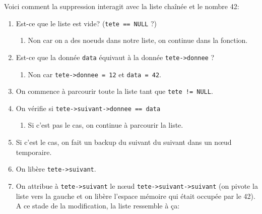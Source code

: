 \documentclass[11pt]{article}
\begin{document}
Voici comment la suppression interagit avec la liste chaînée et le nombre 42:
\begin{enumerate}
\item Est-ce que le liste est vide? (\texttt{tete == NULL} ?)
  \begin{enumerate}
  \item Non car on a des noeuds dans notre liste, on continue dans la fonction.
  \end{enumerate}
\item Est-ce que la donnée \texttt{data} équivaut à la donnée \texttt{tete->donnee} ?
  \begin{enumerate}
  \item Non car \texttt{tete->donnee = 12} et \texttt{data = 42}.
  \end{enumerate}
\item On commence à parcourir toute la liste tant que \texttt{tete != NULL}.
\item On vérifie si \texttt{tete->suivant->donnee == data}
  \begin{enumerate}
  \item Si c'est pas le cas, on continue à parcourir la liste.
  \end{enumerate}
\item Si c'est le cas, on fait un backup du suivant du suivant dans un n\oe{}ud temporaire.
\item On libère \texttt{tete->suivant}.
\item On attribue à \texttt{tete->suivant} le n\oe{}ud \texttt{tete->suivant->suivant} (on pivote la liste vers la gauche et on libère l'espace mémoire qui était occupée par le 42).\\
  A ce stade de la modification, la liste ressemble à ça:\\\\
\end{enumerate}
\end{document}
